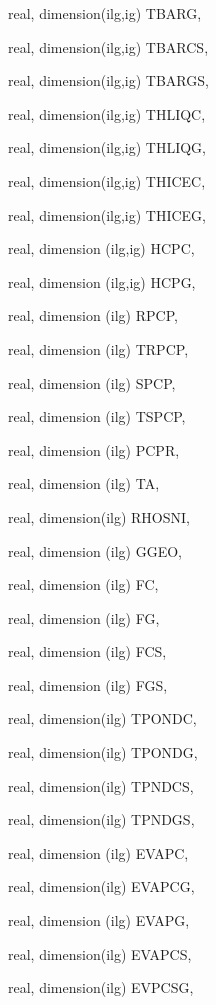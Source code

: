 {\begin{DoxyParamCaption}
\item[{real, dimension(ilg,ig)}]{T\+B\+A\+R\+G, }
\item[{real, dimension(ilg,ig)}]{T\+B\+A\+R\+C\+S, }
\item[{real, dimension(ilg,ig)}]{T\+B\+A\+R\+G\+S, }
\item[{real, dimension(ilg,ig)}]{T\+H\+L\+I\+Q\+C, }
\item[{real, dimension(ilg,ig)}]{T\+H\+L\+I\+Q\+G, }
\item[{real, dimension(ilg,ig)}]{T\+H\+I\+C\+E\+C, }
\item[{real, dimension(ilg,ig)}]{T\+H\+I\+C\+E\+G, }
\item[{real, dimension  (ilg,ig)}]{H\+C\+P\+C, }
\item[{real, dimension  (ilg,ig)}]{H\+C\+P\+G, }
\item[{real, dimension  (ilg)}]{R\+P\+C\+P, }
\item[{real, dimension (ilg)}]{T\+R\+P\+C\+P, }
\item[{real, dimension  (ilg)}]{S\+P\+C\+P, }
\item[{real, dimension (ilg)}]{T\+S\+P\+C\+P, }
\item[{real, dimension  (ilg)}]{P\+C\+P\+R, }
\item[{real, dimension    (ilg)}]{T\+A, }
\item[{real, dimension(ilg)}]{R\+H\+O\+S\+N\+I, }
\item[{real, dimension  (ilg)}]{G\+G\+E\+O, }
\item[{real, dimension    (ilg)}]{F\+C, }
\item[{real, dimension    (ilg)}]{F\+G, }
\item[{real, dimension   (ilg)}]{F\+C\+S, }
\item[{real, dimension   (ilg)}]{F\+G\+S, }
\item[{real, dimension(ilg)}]{T\+P\+O\+N\+D\+C, }
\item[{real, dimension(ilg)}]{T\+P\+O\+N\+D\+G, }
\item[{real, dimension(ilg)}]{T\+P\+N\+D\+C\+S, }
\item[{real, dimension(ilg)}]{T\+P\+N\+D\+G\+S, }
\item[{real, dimension (ilg)}]{E\+V\+A\+P\+C, }
\item[{real, dimension(ilg)}]{E\+V\+A\+P\+C\+G, }
\item[{real, dimension (ilg)}]{E\+V\+A\+P\+G, }
\item[{real, dimension(ilg)}]{E\+V\+A\+P\+C\+S, }
\item[{real, dimension(ilg)}]{E\+V\+P\+C\+S\+G, }

\end{DoxyParamCaption}}
